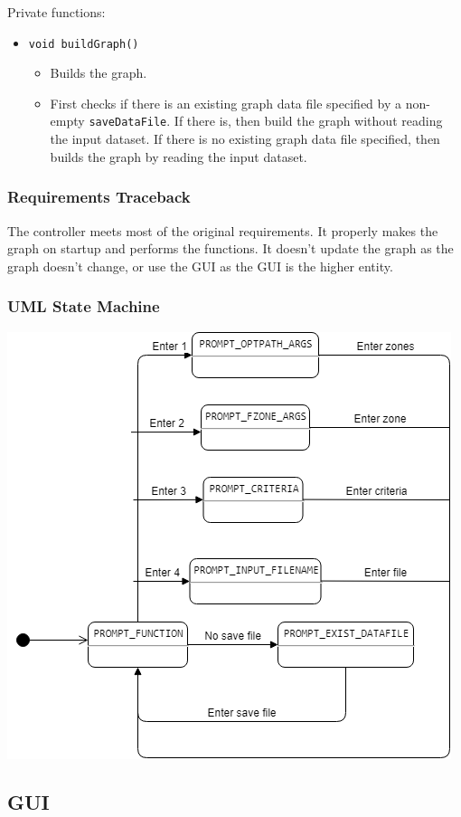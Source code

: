 \documentclass[12pt]{article}
\newcommand{\bi}{\begin{itemize}}
\newcommand{\ei}{\end{itemize}}
\newcommand{\code}[1]{\texttt{#1}}
\begin{document}
\noindent Private functions:
\bi
   	\item \code{void buildGraph()}
	\bi
		\item Builds the graph. 
		\item First checks if there is an existing graph data file specified by a non-empty \code{saveDataFile}. If there is, then build the graph without reading the input dataset. If there is no existing graph data file specified, then builds the graph by reading the input dataset. 
	\ei
\ei

\subsubsection{Requirements Traceback}

The controller meets most of the original requirements. It properly makes the graph on startup and performs the functions. It doesn't update the graph as the graph doesn't change, or use the GUI as the GUI is the higher entity.

\subsubsection{UML State Machine}

\includegraphics[scale = 0.75]{Images/ControllerForGUIDiagram.png} 

\newpage

\subsection{GUI}
\end{document}
